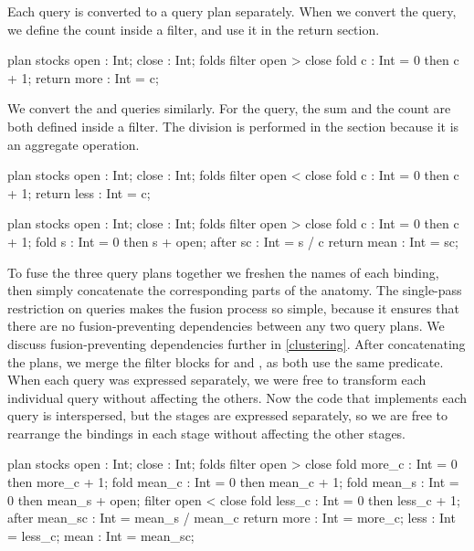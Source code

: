 Each query is converted to a query plan separately.
When we convert the \IcC@more@ query, we define the count inside a filter, and use it in the return section.

\begin{icicle-core}
plan stocks { open : Int; close : Int; }
folds { filter open > close {
    fold c    : Int = 0 then c + 1; } }
return { more : Int = c; }
\end{icicle-core}

We convert the \IcC@less@ and \IcC@mean@ queries similarly.
For the \IcC@mean@ query, the sum and the count are both defined inside a filter.
The division is performed in the \IcC@after@ section because it is an aggregate operation.

\begin{icicle-core}
plan stocks { open : Int; close : Int; }
folds { filter open < close {
    fold c    : Int = 0 then c + 1; } }
return { less : Int = c; }

plan stocks { open : Int; close : Int; }
folds { filter open > close {
    fold c    : Int = 0 then c + 1;
    fold s    : Int = 0 then s + open; } }
after  { sc   : Int = s / c }
return { mean : Int = sc; }
\end{icicle-core}

To fuse the three query plans together we freshen the names of each binding, then simply concatenate the corresponding parts of the anatomy.
The single-pass restriction on queries makes the fusion process so simple, because it ensures that there are no fusion-preventing dependencies between any two query plans. 
We discuss fusion-preventing dependencies further in \cref{clustering}.
After concatenating the plans, we merge the filter blocks for \IcC@more@ and \IcC@mean@, as both use the same predicate.
When each query was expressed separately, we were free to transform each individual query without affecting the others.
Now the code that implements each query is interspersed, but the stages are expressed separately, so we are free to rearrange the bindings in each stage without affecting the other stages.

\begin{icicle-core}
plan stocks { open : Int; close : Int; }
folds {
  filter open > close {
    fold more_c  : Int = 0 then more_c + 1;
    fold mean_c  : Int = 0 then mean_c + 1;
    fold mean_s  : Int = 0 then mean_s + open; }
  filter open < close {
    fold less_c  : Int = 0 then less_c + 1; } }
after  { mean_sc : Int = mean_s / mean_c }
return { more    : Int = more_c;
         less    : Int = less_c;
         mean    : Int = mean_sc; }
\end{icicle-core}

